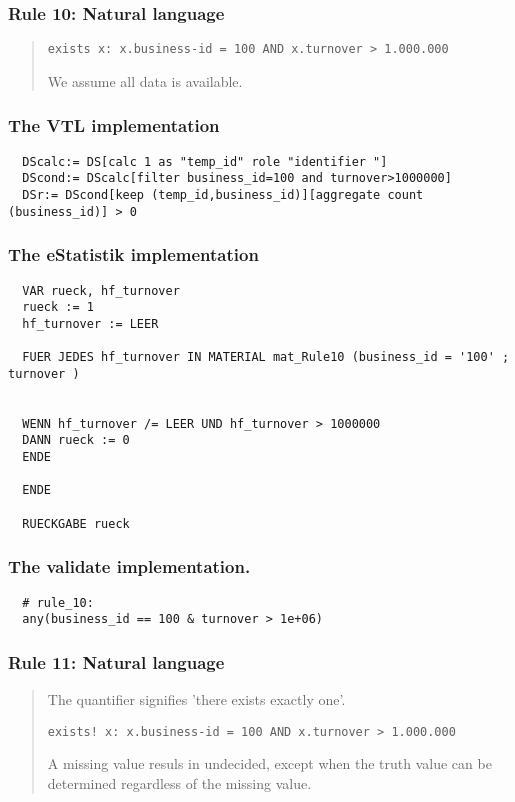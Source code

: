 \newpage

\subsubsection*{  Rule 10: Natural language}
\begin{quote}


\begin{verbatim}
exists x: x.business-id = 100 AND x.turnover > 1.000.000
\end{verbatim}

We assume all data is available.


\end{quote}
\subsubsection*{The VTL implementation}
\begin{verbatim}
  DScalc:= DS[calc 1 as "temp_id" role "identifier "]
  DScond:= DScalc[filter business_id=100 and turnover>1000000]
  DSr:= DScond[keep (temp_id,business_id)][aggregate count (business_id)] > 0
\end{verbatim}
\subsubsection*{The eStatistik implementation}
\begin{verbatim}
  VAR rueck, hf_turnover
  rueck := 1
  hf_turnover := LEER

  FUER JEDES hf_turnover IN MATERIAL mat_Rule10 (business_id = '100' ; turnover )


  WENN hf_turnover /= LEER UND hf_turnover > 1000000
  DANN rueck := 0
  ENDE

  ENDE

  RUECKGABE rueck
\end{verbatim}
\subsubsection*{The validate implementation.}
\begin{verbatim}
  # rule_10:
  any(business_id == 100 & turnover > 1e+06)
\end{verbatim}


\newpage

\subsubsection*{  Rule 11: Natural language}
\begin{quote}


The  quantifier signifies 'there exists exactly one'.


\begin{verbatim}
exists! x: x.business-id = 100 AND x.turnover > 1.000.000
\end{verbatim}

A missing value resuls in undecided, except when the truth value can be determined regardless of the missing value.



\end{quote}
